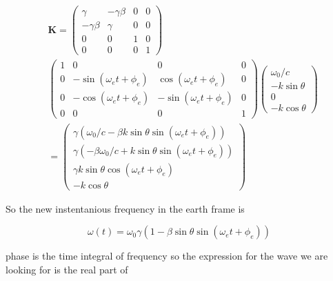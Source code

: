 \documentclass[twocolumn, groupedaddress]{revtex4-1}
\begin{document}
\begin{align}
\label{eqn: new k}
&\mathbf{K} =
\left( \begin{array}{cccc}
	    \gamma   & -\gamma \beta & 0 & 0 \\
	-\gamma \beta &    \gamma    & 0 & 0 \\
	      0      &       0      & 1 & 0 \\
	      0      &       0      & 0 & 1
\end{array} \right)															\nonumber
\\ &\left( \begin{array}{cccc}
	1 &               0             &              0               & 0 \\
	0 & -\sin (\omega_e t + \phi_e) &  \cos (\omega_e t + \phi_e)  & 0 \\
	0 & -\cos (\omega_e t + \phi_e) &  -\sin (\omega_e t + \phi_e) & 0 \\
	0 &               0             &              0               & 1
\end{array} \right)							 
\left( \begin{array}{c}	
	   \omega_0 / c   \\
	- k \sin \theta \\
	        0       \\
	- k \cos \theta    
\end{array} \right)															\nonumber
\\ &=
\left( \begin{array}{c}
	\gamma \left(\omega_0 / c - \beta k \sin \theta \sin (\omega_e t + \phi_e)\right) \\
	\gamma \left(-\beta \omega_0 / c + k \sin \theta \sin (\omega_e t + \phi_e)\right) \\
	           \gamma k \sin \theta \cos (\omega_e t + \phi_e)           \\
	                           - k \cos \theta
\end{array} \right)   
\end{align}

So the new instentanious frequency in the earth frame is

\begin{equation}
\omega (t) = \omega_0 \gamma \left( 1 - \beta \sin \theta \sin (\omega_e t + \phi_e) \right) 
\end{equation}

phase is the time integral of frequency so the expression for the wave we are looking for is the real part of 
\end{document}
